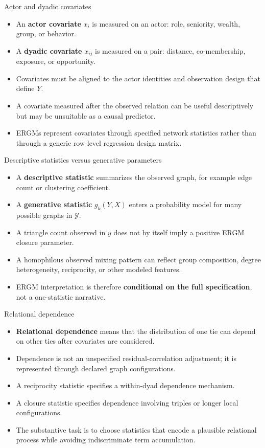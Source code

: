 \documentclass[aspectratio=169,11pt]{beamer}
\newcommand{\term}[1]{\textbf{\color{nupurple}#1}}
\begin{document}
\begin{frame}{Actor and dyadic covariates}
\begin{itemize}
\item An \term{actor covariate} $x_i$ is measured on an actor: role, seniority, wealth, group, or behavior.
\item A \term{dyadic covariate} $x_{ij}$ is measured on a pair: distance, co-membership, exposure, or opportunity.
\item Covariates must be aligned to the actor identities and observation design that define $Y$.
\item A covariate measured after the observed relation can be useful descriptively but may be unsuitable as a causal predictor.
\item ERGMs represent covariates through specified network statistics rather than through a generic row-level regression design matrix.
\end{itemize}
\end{frame}

\begin{frame}{Descriptive statistics versus generative parameters}
\begin{itemize}
\item A \term{descriptive statistic} summarizes the observed graph, for example edge count or clustering coefficient.
\item A \term{generative statistic} $g_k(Y,X)$ enters a probability model for many possible graphs in $\mathcal{Y}$.
\item A triangle count observed in $y$ does not by itself imply a positive ERGM closure parameter.
\item A homophilous observed mixing pattern can reflect group composition, degree heterogeneity, reciprocity, or other modeled features.
\item ERGM interpretation is therefore \term{conditional on the full specification}, not a one-statistic narrative.
\end{itemize}
\end{frame}

\begin{frame}{Relational dependence}
\begin{itemize}
\item \term{Relational dependence} means that the distribution of one tie can depend on other ties after covariates are considered.
\item Dependence is not an unspecified residual-correlation adjustment; it is represented through declared graph configurations.
\item A reciprocity statistic specifies a within-dyad dependence mechanism.
\item A closure statistic specifies dependence involving triples or longer local configurations.
\item The substantive task is to choose statistics that encode a plausible relational process while avoiding indiscriminate term accumulation.
\end{itemize}
\end{frame}
\end{document}
